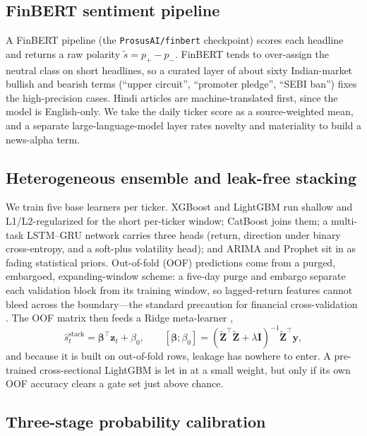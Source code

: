 \documentclass[12pt,a4paper]{article}
\begin{document}
\subsection{FinBERT sentiment pipeline}

A FinBERT pipeline \cite{r_araci} (the \texttt{ProsusAI/finbert} checkpoint) scores
each headline and returns a raw polarity $\tilde{s}=p_+-p_-$. FinBERT tends to
over-assign the neutral class on short headlines, so a curated layer of about sixty
Indian-market bullish and bearish terms (``upper circuit'', ``promoter pledge'',
``SEBI ban'') fixes the high-precision cases. Hindi articles are
machine-translated first, since the model is English-only. We take the daily ticker
score as a source-weighted mean, and a separate large-language-model layer rates
novelty and materiality to build a news-alpha term.

\subsection{Heterogeneous ensemble and leak-free stacking}

We train five base learners per ticker. XGBoost \cite{r_xgboost} and LightGBM
\cite{r_lightgbm} run shallow and L1/L2-regularized for the short per-ticker
window; CatBoost \cite{r_catboost} joins them; a multi-task LSTM--GRU network
carries three heads (return, direction under binary cross-entropy, and a soft-plus
volatility head); and ARIMA and Prophet sit in as fading statistical priors.
Out-of-fold (OOF) predictions come from a purged, embargoed, expanding-window
scheme: a five-day purge and embargo separate each validation block from its
training window, so lagged-return features cannot bleed across the boundary---the
standard precaution for financial cross-validation \cite{r_prado}. The OOF matrix
then feeds a Ridge meta-learner \cite{r_wolpert},
\begin{equation}
\hat{s}^{\mathrm{stack}}_t=\boldsymbol{\beta}^{\!\top}\mathbf{z}_t+\beta_0,\qquad
[\boldsymbol{\beta};\beta_0]=(\tilde{\mathbf Z}^{\!\top}\tilde{\mathbf Z}+\lambda\mathbf I)^{-1}\tilde{\mathbf Z}^{\!\top}\mathbf y ,
\label{eq:stack}
\end{equation}
and because it is built on out-of-fold rows, leakage has nowhere to enter. A
pre-trained cross-sectional LightGBM is let in at a small weight, but only if its
own OOF accuracy clears a gate set just above chance.

\subsection{Three-stage probability calibration}
\end{document}
